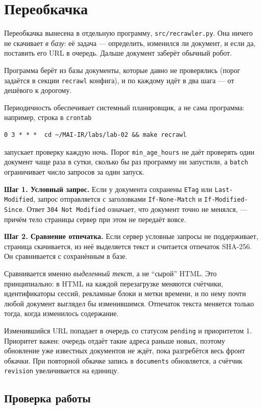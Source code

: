 \section{Переобкачка}

Переобкачка вынесена в отдельную программу, \texttt{src/recrawler.py}. Она ничего не
скачивает \emph{в базу}: её задача --- определить, изменился ли документ, и если
да, поставить его URL в очередь. Дальше документ заберёт обычный робот.

Программа берёт из базы документы, которые давно не проверялись (порог задаётся
в секции \texttt{recrawl} конфига), и по каждому идёт в два шага --- от дешёвого
к дорогому.

Периодичность обеспечивает системный планировщик, а не сама программа: например,
строка в \texttt{crontab}
\begin{verbatim}
0 3 * * *  cd ~/MAI-IR/labs/lab-02 && make recrawl
\end{verbatim}
запускает проверку каждую ночь. Порог \texttt{min\_age\_hours} не даёт проверять
один документ чаще раза в сутки, сколько бы раз программу ни запустили, а
\texttt{batch} ограничивает число запросов за один запуск.

\textbf{Шаг 1. Условный запрос.} Если у документа сохранены \texttt{ETag} или
\texttt{Last-Modified}, запрос отправляется с заголовками
\texttt{If-None-Match} и \texttt{If-Modified-Since}. Ответ \texttt{304 Not
Modified} означает, что документ точно не менялся, --- причём тело страницы
сервер при этом не передаёт вовсе.

\textbf{Шаг 2. Сравнение отпечатка.} Если сервер условные запросы не
поддерживает, страница скачивается, из неё выделяется текст и считается
отпечаток SHA-256. Он сравнивается с сохранённым в базе.

Сравнивается именно \emph{выделенный текст}, а не \enquote{сырой} HTML. Это
принципиально: в HTML на каждой перезагрузке меняются счётчики, идентификаторы
сессий, рекламные блоки и метки времени, и по нему почти любой документ выглядел
бы изменившимся. Отпечаток текста меняется только тогда, когда изменилось
содержание.

Изменившийся URL попадает в очередь со статусом \texttt{pending} и приоритетом
1. Приоритет важен: очередь отдаёт такие адреса раньше новых, поэтому обновление
уже известных документов не ждёт, пока разгребётся весь фронт обкачки. При
повторной обкачке запись в \texttt{documents} обновляется, а счётчик
\texttt{revision} увеличивается на единицу.

\subsection*{Проверка работы}

